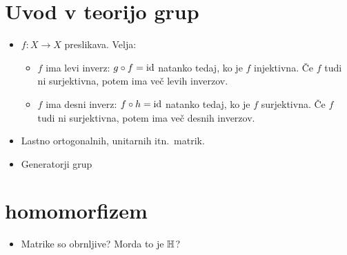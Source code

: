 \section{Uvod v teorijo grup}
\begin{itemize}
    \item \(f: X \to X\) preslikava. Velja:
    \begin{itemize}
        \item \(f\) ima levi inverz: \(g \circ f = \operatorname{id}\) natanko tedaj, ko je \(f\) injektivna. Če \(f\) tudi ni surjektivna, potem ima več levih inverzov.
        \item \(f\) ima desni inverz: \(f \circ h = \operatorname{id}\) natanko tedaj, ko je \(f\) surjektivna. Če \(f\) tudi ni surjektivna, potem ima več desnih inverzov.
    \end{itemize}
    \item Lastno ortogonalnih, unitarnih itn.\ matrik.
    \item Generatorji grup
\end{itemize}

\section{homomorfizem}
\begin{itemize}
    \item Matrike so obrnljive? Morda to je \(\mathbb{H}\)?
\end{itemize}
